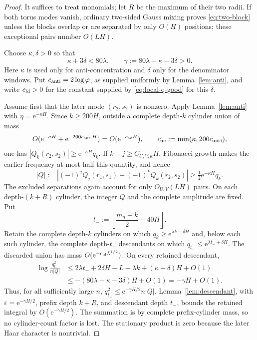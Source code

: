 \documentclass[11pt,a4paper]{amsart}
\theoremstyle{definition}
\theoremstyle{remark}
\newcommand{\e}{\mathrm e}
\begin{document}
\begin{proof}
It suffices to treat monomials; let $R$ be the maximum of their two radii.
If both torus modes vanish, ordinary
two-sided Gauss mixing proves \eqref{eq:two-block} unless the blocks overlap
or are separated by only $O(H)$ positions; these exceptional pairs number
$O(LH)$.

Choose $\kappa,\delta>0$ so that
\[
 \kappa+3\delta<80\lambda,
 \qquad \gamma:=80\lambda-\kappa-3\delta>0.
\]
Here $\kappa$ is used only for anti-concentration and $\delta$ only for the
denominator windows.  Put $c_{\rm anti}=2\log\varphi$, as supplied uniformly
by Lemma~\ref{lem:anti}, and write $c_{\rm ld}>0$
for the constant supplied by \eqref{eq:local-q-good} for this $\delta$.

Assume first that the later mode $(r_2,s_2)$ is nonzero.  Apply
Lemma~\ref{lem:anti} with $\eta=\e^{-\kappa H}$.  Since $k\ge200H$, outside a
complete depth-$k$ cylinder union of mass
\[
 O(\e^{-\kappa H}+\e^{-200c_{\rm anti}H})
 =O(\e^{-c_{\rm ac}H}),
 \qquad c_{\rm ac}:=\min(\kappa,200c_{\rm anti}),
\]
one has $|Q_k(r_2,s_2)|\ge\e^{-\kappa H}q_k$.  If
$k-j\ge C_{U,V,\kappa}H$, Fibonacci growth makes the earlier frequency at
most half this quantity, and hence
\[
 |Q|:=|(-1)^jQ_j(r_1,s_1)+(-1)^kQ_k(r_2,s_2)|
 \ge\tfrac12\e^{-\kappa H}q_k.
\]
The excluded separations again account for only $O_{U,V}(LH)$ pairs.  On
each depth-$(k+R)$ cylinder, the integer $Q$ and the complete amplitude are
fixed.  Put
\[
 t_-:=\left\lfloor\frac{m_n+k}{2}-40H\right\rfloor.
\]
Retain the complete depth-$k$ cylinders on which
$q_k\ge \e^{\lambda k-\delta H}$ and, below each such cylinder, the complete
depth-$t_-$ descendants on which
$q_{t_-}\le \e^{\lambda t_-+\delta H}$.  The discarded union has mass
$O(\e^{-c_{\rm ld}L^{1/2}})$.  On every retained descendant,
\begin{align*}
 \log\frac{q_{t_-}^2}{n|Q|}
 &\le 2\lambda t_-+2\delta H
       -L-\lambda k+(\kappa+\delta)H+O(1)\\
 &\le-(80\lambda-\kappa-3\delta)H+O(1)
 =-\gamma H+O(1).
\end{align*}
Thus, for all sufficiently large $n$,
$q_{t_-}^2\le\e^{-\gamma H/2}n|Q|$.  Lemma~\ref{lem:descendant}, with
$\varepsilon=\e^{-\gamma H/2}$, prefix depth $k+R$, and descendant depth
$t_-$, bounds the retained integral by $O(\e^{-\gamma H/2})$.  The summation
is by complete prefix-cylinder mass, so no cylinder-count factor is lost.
The stationary product is zero because the later Haar character is
nontrivial.


\end{proof}
\end{document}

